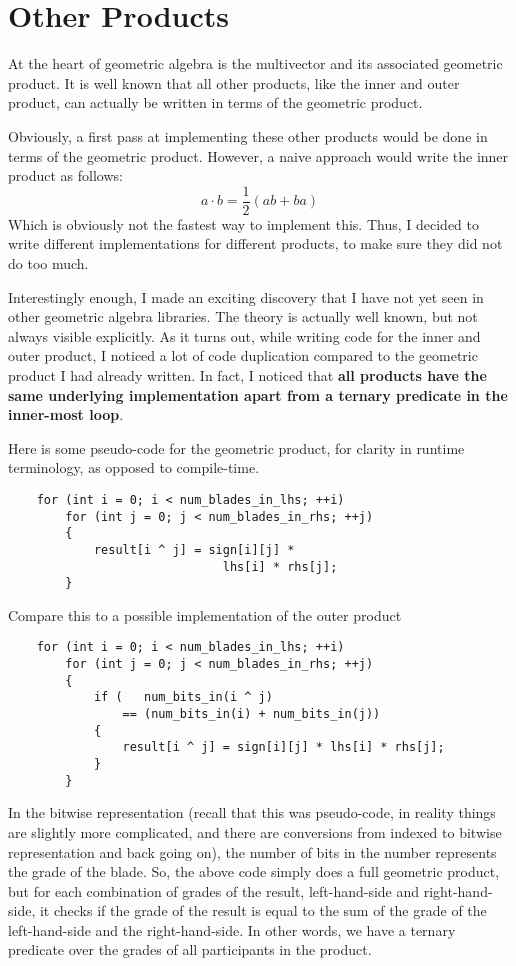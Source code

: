 \documentclass[10pt]{article}
\begin{document}
\section{Other Products}

At the heart of geometric algebra is the multivector and its
associated geometric product. It is well known that all other
products, like the inner and outer product, can actually be
written in terms of the geometric product.

Obviously, a first pass at implementing these other products would
be done in terms of the geometric product. However, a naive
approach would write the inner product as follows:
\begin{displaymath}
    a\cdot b = \frac{1}{2}(ab + ba)
\end{displaymath}
Which is obviously not the fastest way to implement this. Thus, I
decided to write different implementations for different products,
to make sure they did not do too much.

Interestingly enough, I made an exciting discovery that I have not
yet seen in other geometric algebra libraries. The theory is
actually well known, but not always visible explicitly. As it
turns out, while writing code for the inner and outer product, I
noticed a lot of code duplication compared to the geometric
product I had already written. In fact, I noticed that \textbf{all
products have the same underlying implementation apart from a
ternary predicate in the inner-most loop}.

Here is some pseudo-code for the geometric product, for clarity in
runtime terminology, as opposed to compile-time.
\begin{verbatim}
    for (int i = 0; i < num_blades_in_lhs; ++i)
        for (int j = 0; j < num_blades_in_rhs; ++j)
        {
            result[i ^ j] = sign[i][j] *
                              lhs[i] * rhs[j];
        }
\end{verbatim}
Compare this to a possible implementation of the outer product
\begin{verbatim}
    for (int i = 0; i < num_blades_in_lhs; ++i)
        for (int j = 0; j < num_blades_in_rhs; ++j)
        {
            if (   num_bits_in(i ^ j)
                == (num_bits_in(i) + num_bits_in(j))
            {
                result[i ^ j] = sign[i][j] * lhs[i] * rhs[j];
            }
        }
\end{verbatim}
In the bitwise representation (recall that this was pseudo-code,
in reality things are slightly more complicated, and there are
conversions from indexed to bitwise representation and back going
on), the number of bits in the number represents the grade of the
blade. So, the above code simply does a full geometric product,
but for each combination of grades of the result, left-hand-side
and right-hand-side, it checks if the grade of the result is equal
to the sum of the grade of the left-hand-side and the
right-hand-side. In other words, we have a ternary predicate over
the grades of all participants in the product.
\end{document}
